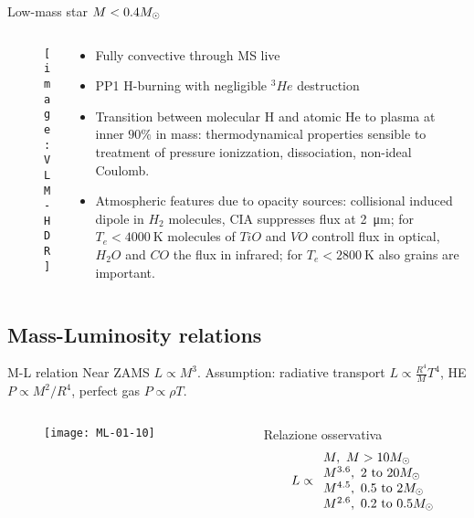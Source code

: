 \begin{frame}{Low-mass star $M<0.4M_{\odot}{}$}
\begin{columns}[T]\begin{column}{0.4\textwidth}
\begin{figure}[!ht]
\texttt{[image: VLM-HDR]}\label{fig:VLM-HDR}
\end{figure}
\end{column}
\begin{column}{0.6\textwidth}
\begin{itemize}
    \item Fully convective through MS live
    \item PP1 H-burning with negligible $^3He$ destruction
    \item Transition between molecular H and atomic He to plasma at inner $90\%$ in mass: thermodynamical properties sensible to treatment of pressure ionizzation, dissociation, non-ideal Coulomb.
    \item Atmospheric features due to opacity sources: collisional induced dipole in $H_2$ molecules, CIA suppresses flux at \SI{2}{\micro\meter}; for $T_e<\SI{4000}{\kelvin}$ molecules of $TiO$ and $VO$ controll flux in optical, $H_2O$ and $CO$ the flux in infrared; for $T_e<\SI{2800}{\kelvin}$ also grains are important.
\end{itemize}
\end{column}\end{columns}
\end{frame}

\subsection{Mass-Luminosity relations}

\begin{frame}{M-L relation}
Near ZAMS $L\propto M^3$. Assumption: radiative transport $L\propto\frac{R^4}{M}T^4$, HE $P\propto M^2/R^4$, perfect gas $P\propto\rho T$.
\begin{columns}[T]\begin{column}{0.5\textwidth}
\begin{figure}[!ht]
\texttt{[image: ML-01-10]}\label{fig:ML-01-10}
\end{figure}
\end{column}
\begin{column}{0.5\textwidth}
Relazione osservativa
\begin{equation*}
L\propto\begin{array}{l}
M,\ M>10\msun{}\\
M\expy{3.6},\ \numrange{2}{20}\msun{}\\
M\expy{4.5},\ \numrange{0.5}{2}\msun{}\\
M\expy{2.6},\ \numrange{0.2}{0.5}\msun{}\\
\end{array}
\end{equation*}
\end{column}\end{columns}
\end{frame}

